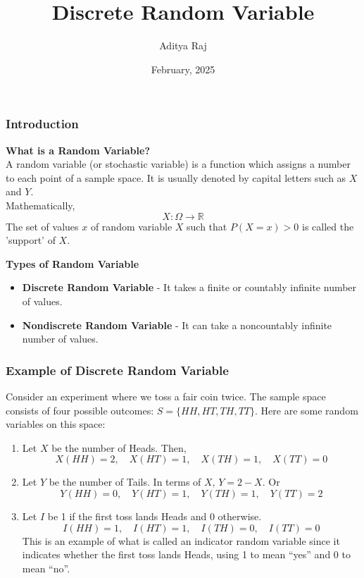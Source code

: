 \documentclass{beamer}
\title{Discrete Random Variable}
\author{Aditya Raj}
\institute{GKCIET, Malda \\ Computer Science and Engineering Department \\ Roll No: 35530824051}
\date{February, 2025}
\begin{document}
\begin{frame}
    \titlepage
\end{frame}

\begin{frame}
    \frametitle{Introduction}
    \textbf{What is a Random Variable?} \\
    A random variable (or stochastic variable) is a function which assigns a number to each point of a sample space. It is usually denoted by capital letters such as $X$ and $Y$. \\
    Mathematically, \\
    $$X: \Omega \rightarrow \mathbb{R}$$
    The set of values $x$ of random variable $X$ such that $P(X= x) > 0$ is called the 'support' of $X$.

    \textbf{Types of Random Variable}
    \begin{itemize}
        \item \textbf{Discrete Random Variable} - It takes a finite or countably infinite number of values.
        \item \textbf{Nondiscrete Random Variable} - It can take a noncountably infinite number of values.
    \end{itemize}
\end{frame}

\begin{frame}
    \frametitle{Example of Discrete Random Variable}
    Consider an experiment where we toss a fair coin twice. The sample space consists of four possible outcomes: $S = \{HH, HT, TH, TT\}$. Here are some random variables on this space:
    \begin{enumerate}
        \item Let $X$ be the number of Heads. Then,
        $$X(HH) = 2, \quad X(HT) = 1, \quad X(TH) = 1, \quad X(TT) = 0$$
        \item Let $Y$ be the number of Tails. In terms of $X$, $Y = 2 - X$. Or
        $$Y(HH) = 0, \quad Y(HT) = 1, \quad Y(TH) = 1, \quad Y(TT) = 2$$
        \item Let $I$ be 1 if the first toss lands Heads and 0 otherwise.
        $$I(HH) = 1, \quad I(HT) = 1, \quad I(TH) = 0, \quad I(TT) = 0$$
        This is an example of what is called an indicator random variable since it indicates whether the first toss lands Heads, using 1 to mean “yes” and 0 to mean “no”.
    \end{enumerate}
\end{frame}
\end{document}
